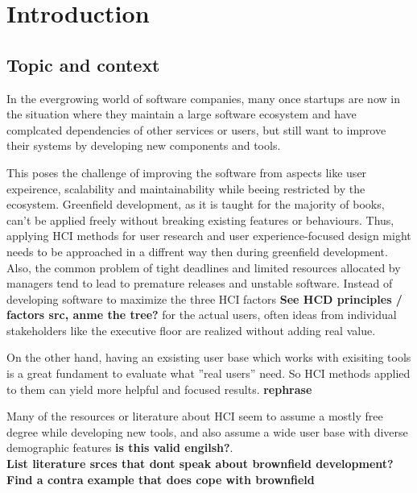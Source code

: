 %
\chapter{Introduction}
\label{chap:introduction}

\section{Topic and context}

In the evergrowing world of software companies, many once startups are now in the situation where they maintain a large software ecosystem and have complcated dependencies of other services or users,
but still want to improve their systems by developing new components and tools.

This poses the challenge of improving the software from aspects like user expeirence, scalability and maintainability while beeing restricted by the ecosystem.
Greenfield development, as it is taught for the majority of books, can't be applied freely without breaking existing features or behaviours.
Thus, applying HCI methods for user research and user experience-focused design might needs to be approached in a diffrent way then during greenfield development.
Also, the common problem of tight deadlines and limited resources allocated by managers tend to lead to premature releases and unstable software.
Instead of developing software to maximize the three HCI factors \textbf{See HCD principles / factors src, anme the tree?} for the actual users, often ideas from individual stakeholders like the executive floor are realized without adding real value.

On the other hand, having an exsisting user base which works with exisiting tools is a great fundament to evaluate what ''real users'' need. So HCI methods applied to them can yield more helpful and focused results. \textbf{rephrase}

Many of the resources or literature about HCI seem to assume a mostly free degree while developing new tools, and also assume a wide user base with diverse demographic features \textbf{is this valid engilsh?}.
\\
\textbf{List literature srces that dont speak about brownfield development?}
\textbf{Find a contra example that does cope with brownfield}
	

